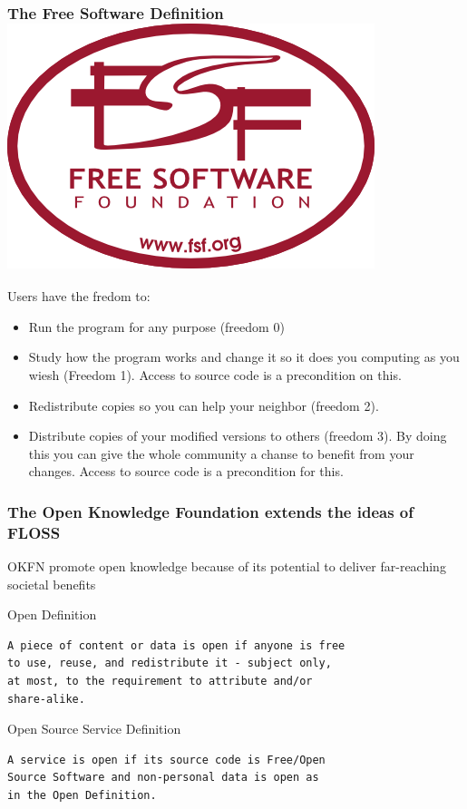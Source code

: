 \documentclass[hyperref={pdfpagelabels=false},xcolor=pst,pdf,fragile]{beamer}
\begin{document}
\begin{frame}
  \frametitle{The Free Software Definition \includegraphics[scale=0.09]{img/fsf.png}}

  Users have the fredom to:

  \begin{itemize}
	\item Run the program for any purpose (freedom 0)
	\pause
	\item Study how the program works and change it  so it does you
	  computing as you wiesh (Freedom 1). Access to source code is a
	  precondition on this.
	\pause
	\item Redistribute copies so you can help your neighbor (freedom 2).
	\pause
	\item Distribute copies of your modified versions to others (freedom
	  3). By doing this you can give the whole community a chanse to
	  benefit from your changes. Access to source code is a precondition
	  for this.
  \end{itemize}

\end{frame}

\begin{frame}[fragile]
  \frametitle{The Open Knowledge Foundation extends the ideas of FLOSS}

  OKFN promote open knowledge because of its potential to deliver
  far-reaching societal benefits

  \pause
  \begin{block}{Open Definition} %
	  \begin{lstlisting}
A piece of content or data is open if anyone is free
to use, reuse, and redistribute it - subject only,
at most, to the requirement to attribute and/or
share-alike.

	  \end{lstlisting}
  \end{block}

  \pause
  \begin{block}{Open Source Service Definition}
	  \begin{lstlisting}
A service is open if its source code is Free/Open
Source Software and non-personal data is open as
in the Open Definition.

	  \end{lstlisting}
  \end{block}

\end{frame}
\end{document}
